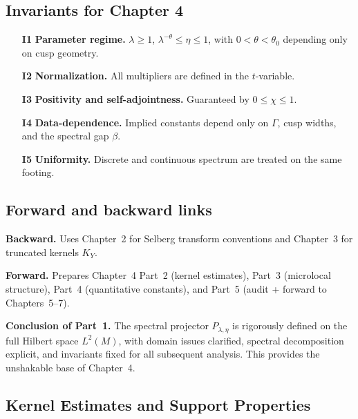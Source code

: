 \subsection*{Invariants for Chapter 4}

\begin{itemize}
  \item[\textbf{I1}] \textbf{Parameter regime.} $\lambda\ge1$, $\lambda^{-\theta}\le\eta\le1$, with $0<\theta<\theta_0$ depending only on cusp geometry.  
  \item[\textbf{I2}] \textbf{Normalization.} All multipliers are defined in the $t$-variable.  
  \item[\textbf{I3}] \textbf{Positivity and self-adjointness.} Guaranteed by $0\le\chi\le1$.  
  \item[\textbf{I4}] \textbf{Data-dependence.} Implied constants depend only on $\Gamma$, cusp widths, and the spectral gap $\beta$.  
  \item[\textbf{I5}] \textbf{Uniformity.} Discrete and continuous spectrum are treated on the same footing.  
\end{itemize}

\subsection*{Forward and backward links}

\noindent\textbf{Backward.} Uses Chapter~2 for Selberg transform conventions and Chapter~3 for truncated kernels $K_Y$.  

\noindent\textbf{Forward.} Prepares Chapter~4 Part~2 (kernel estimates), Part~3 (microlocal structure), Part~4 (quantitative constants), and Part~5 (audit + forward to Chapters~5–7).  

\medskip
\noindent\textbf{Conclusion of Part~1.}  
The spectral projector $P_{\lambda,\eta}$ is rigorously defined on the full Hilbert space $L^2(M)$, with domain issues clarified, spectral decomposition explicit, and invariants fixed for all subsequent analysis.  
This provides the unshakable base of Chapter~4.


\subsection{Kernel Estimates and Support Properties}
\label{subsec:proj-kernel-support}


